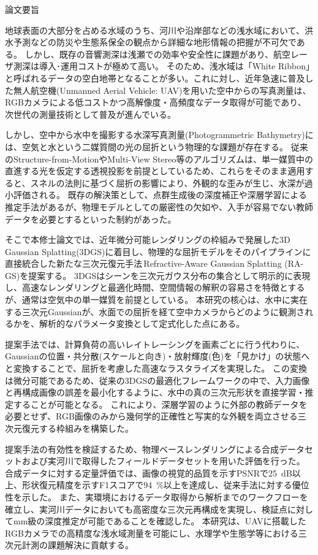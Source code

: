 \begin{center}
  {\fontsize{12pt}{26pt}\selectfont \gtfamily 論文要旨} %
\end{center}
\par \indent

地球表面の大部分を占める水域のうち、河川や沿岸部などの浅水域において、洪水予測などの防災や生態系保全の観点から詳細な地形情報の把握が不可欠である。
しかし、既存の音響測深は浅瀬での効率や安全性に課題があり、航空レーザ測深は導入･運用コストが極めて高い。
そのため、浅水域は「White Ribbon」と呼ばれるデータの空白地帯となることが多い。これに対し、近年急速に普及した無人航空機(Unmanned Aerial Vehicle: UAV)を用いた空中からの写真測量は、RGBカメラによる低コストかつ高解像度・高頻度なデータ取得が可能であり、次世代の測量技術として普及が進んでいる。

しかし、空中から水中を撮影する水深写真測量(Photogrammetric Bathymetry)には、空気と水という二媒質間の光の屈折という物理的な課題が存在する。
従来のStructure-from-MotionやMulti-View Stereo等のアルゴリズムは、単一媒質中の直進する光を仮定する透視投影を前提としているため、これらをそのまま適用すると、スネルの法則に基づく屈折の影響により、外観的な歪みが生じ、水深が過小評価される。
既存の解決策として、点群生成後の深度補正や深層学習による推定手法があるが、物理モデルとしての厳密性の欠如や、入手が容易でない教師データを必要とするといった制約があった。

そこで本修士論文では、近年微分可能レンダリングの枠組みで発展した3D Gaussian Splatting(3DGS)に着目し、物理的な屈折モデルをそのパイプラインに直接統合した新たな三次元復元手法\,Refractive-Aware Gaussian Splatting (RA-GS)を提案する。
3DGSはシーンを三次元ガウス分布の集合として明示的に表現し、高速なレンダリングと最適化時間、空間情報の解釈の容易さを特徴とするが、通常は空気中の単一媒質を前提としている。
本研究の核心は、水中に実在する三次元Gaussianが、水面での屈折を経て空中カメラからどのように観測されるかを、解析的なパラメータ変換として定式化した点にある。

提案手法では、計算負荷の高いレイトレーシングを画素ごとに行う代わりに、Gaussianの位置・共分散(スケールと向き)・放射輝度(色)を「見かけ」の状態へと変換することで、屈折を考慮した高速なラスタライズを実現した。
この変換は微分可能であるため、従来の3DGSの最適化フレームワークの中で、入力画像と再構成画像の誤差を最小化するように、水中の真の三次元形状を直接学習・推定することが可能となる。
これにより、深層学習のように外部の教師データを必要とせず、RGB画像のみから幾何学的正確性と写実的な外観を両立させる三次元復元する枠組みを構築した。

提案手法の有効性を検証するため、物理ベースレンダリングによる合成データセットおよび実河川で取得したフィールドデータセットを用いた評価を行った。
合成データに対する定量評価では、画像の視覚的品質を示すPSNRで\qty{25}{dB}以上、形状復元精度を示すF1スコアで\qty{94}{\percent}以上を達成し、従来手法に対する優位性を示した。
また、実環境におけるデータ取得から解析までのワークフローを確立し、実河川データにおいても高密度な三次元再構成を実現し、検証点に対してmm級の深度推定が可能であることを確認した。
本研究は、UAVに搭載したRGBカメラでの高精度な浅水域測量を可能にし、水理学や生態学等における三次元計測の課題解決に貢献する。

